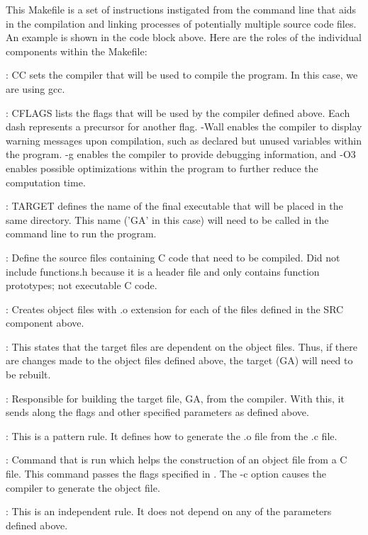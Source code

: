 \documentclass[12pt]{article}
\begin{document}
This Makefile is a set of instructions instigated from the command line that aids in the compilation and linking processes of potentially multiple source code files. An example is shown in the code block above. Here are the roles of the individual components within the Makefile:

: CC sets the compiler that will be used to compile the program. In this case, we are using gcc.

: CFLAGS lists the flags that will be used by the compiler defined above. Each dash represents a precursor for another flag.  -Wall enables the compiler to display warning messages upon compilation, such as declared but unused variables within the program. -g enables the compiler to provide debugging information, and -O3 enables possible optimizations within the program to further reduce the computation time.

: TARGET defines the name of the final executable that will be placed in the same directory. This name ('GA' in this case) will need to be called in the command line to run the program.

: Define the source files containing C code that need to be compiled. Did not include functions.h because it is a header file and only contains function prototypes; not executable C code.

: Creates object files with .o extension for each of the files defined in the SRC component above.

: This states that the target files are dependent on the object files. Thus, if there are changes made to the object files defined above, the target (GA) will need to be rebuilt.

: Responsible for building the target file, GA, from the compiler. With this, it sends along the flags and other specified parameters as defined above.

: This is a pattern rule. It defines how to generate the .o file from the .c file.

: Command that is run which helps the construction of an object file from a C file. This command passes the flags specified in . The -c option causes the compiler to generate the object file.

: This is an independent rule. It does not depend on any of the parameters defined above.
\end{document}
